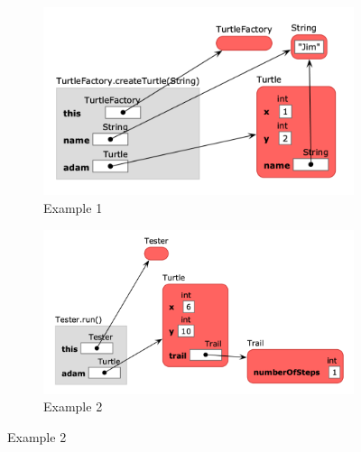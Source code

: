 \documentclass[]{usiinfbachelorproject}
\begin{document}
\begin{figure}[h!]
\centering
\begin{subfigure}{.5\textwidth}
  \centering
  \includegraphics[width=\textwidth-10pt]{figures/informa_clicker_example1.png}
  \caption{Example 1}
  \label{fig:sub1}
\end{subfigure}%
\begin{subfigure}{.5\textwidth}
  \centering
  \includegraphics[width=\textwidth-10pt]{figures/informa_clicker_example2.png}
  \caption{Example 2}
  \label{fig:sub2}
\end{subfigure}
\label{fig:test}
\end{figure}
\end{document}
